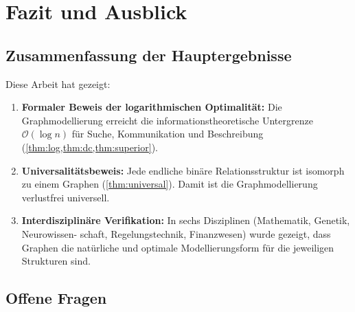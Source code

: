 ﻿\documentclass[12pt,a4paper,twoside]{article}
\theoremstyle{definition}
\theoremstyle{plain}
\theoremstyle{remark}
\begin{document}
\section{Fazit und Ausblick}
\label{sec:fazit}

\subsection{Zusammenfassung der Hauptergebnisse}

Diese Arbeit hat gezeigt:

\begin{enumerate}
  \item \textbf{Formaler Beweis der logarithmischen Optimalität:}
        Die Graphmodellierung erreicht die informationstheoretische
        Untergrenze $\mathcal{O}(\log n)$ für Suche, Kommunikation
        und Beschreibung (\cref{thm:log,thm:dc,thm:superior}).

  \item \textbf{Universalitätsbeweis:}
        Jede endliche binäre Relationsstruktur ist isomorph zu
        einem Graphen (\cref{thm:universal}).  Damit ist die
        Graphmodellierung verlustfrei universell.

  \item \textbf{Interdisziplinäre Verifikation:}
        In sechs Disziplinen (Mathematik, Genetik, Neuro\-wissen-
        schaft, Regelungstechnik, Finanzwesen) wurde gezeigt,
        dass Graphen die natürliche und optimale Modellierungsform
        für die jeweiligen Strukturen sind.
\end{enumerate}

\subsection{Offene Fragen}
\end{document}
